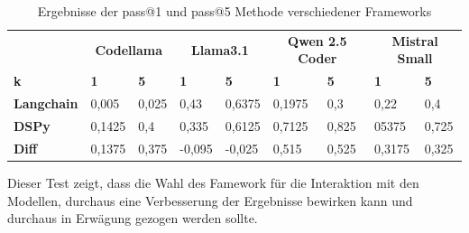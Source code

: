 \begin{table}[!ht]
	\begin{tabular}{|l|ll|ll|ll|ll|}
		\hline
		& \multicolumn{2}{c|}{\textbf{Codellama}} & \multicolumn{2}{c|}{\textbf{Llama3.1}} & \multicolumn{2}{c|}{\textbf{Qwen 2.5 Coder}} & \multicolumn{2}{c|}{\textbf{Mistral Small}} \\
		\textbf{k} & \textbf{1} & \textbf{5} & \textbf{1} & \textbf{5} & \textbf{1} & \textbf{5} & \textbf{1} & \textbf{5} \\
		\hline
		\textbf{Langchain}  & 0,005 & 0,025 & 0,43 & 0,6375  & 0,1975 & 0,3   & 0,22 & 0,4 \\
		\textbf{DSPy}       & 0,1425 & 0,4  & 0,335 & 0,6125 & 0,7125 & 0,825 & 05375 & 0,725 \\
		\hline
		\textbf{Diff} & 0,1375 & 0,375  & -0,095 & -0,025    & 0,515 & 0,525    & 0,3175 & 0,325 \\
		\hline
		\hline
	\end{tabular}
	\centering
	\label{tab:pass_at_k_results_by_framework}
	\caption{Ergebnisse der pass@1 und pass@5 Methode verschiedener Frameworks}
\end{table}

Dieser Test zeigt, dass die Wahl des Famework für die Interaktion mit den Modellen, durchaus eine Verbesserung der Ergebnisse bewirken kann und durchaus in Erwägung gezogen werden sollte.

